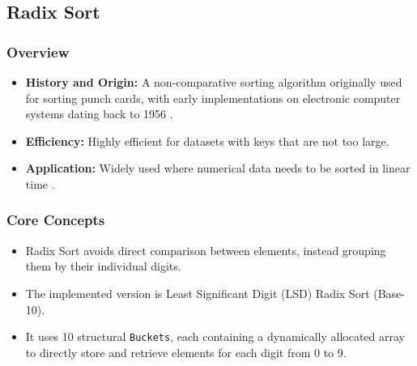 \subsection[Radix Sort]{Radix Sort \cite{shun2019parallel}}
    \subsubsection{Overview}
        \begin{itemize}
            \item \textbf{History and Origin:} A non-comparative sorting algorithm originally used for sorting punch cards, with early implementations on electronic computer systems dating back to 1956 \cite{friend1956sorting}.
            \item \textbf{Efficiency:} Highly efficient for datasets with keys that are not too large.
            \item \textbf{Application:} Widely used where numerical data needs to be sorted in linear time \cite{cormen2022introduction}.
        \end{itemize}
    \subsubsection{Core Concepts}
        \begin{itemize}
            \item Radix Sort avoids direct comparison between elements, instead grouping them by their individual digits.
            \item The implemented version is Least Significant Digit (LSD) Radix Sort (Base-10).
            \item It uses 10 structural \texttt{Buckets}, each containing a dynamically allocated array to directly store and retrieve elements for each digit from 0 to 9.
        \end{itemize}

